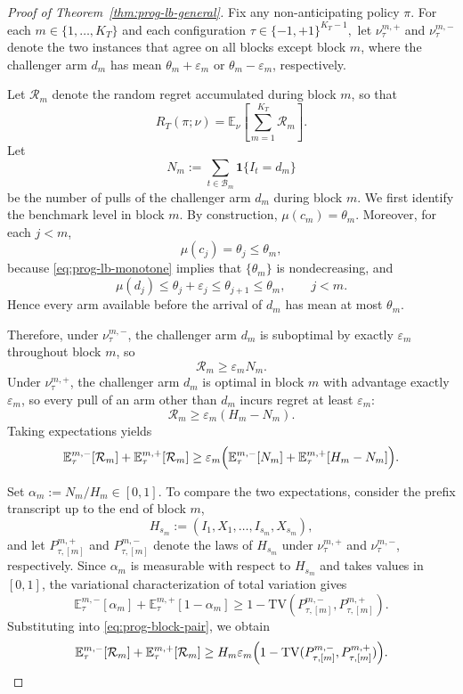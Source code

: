 \documentclass[11pt]{article}
\begin{document}
\begin{proof}[Proof of Theorem~\ref{thm:prog-lb-general}]
Fix any non-anticipating policy $\pi$.
For each $m\in\{1,\dots,K_T\}$ and each configuration
\(
\tau\in\{-1,+1\}^{K_T-1},
\)
let $\nu_{\tau}^{m,+}$ and $\nu_{\tau}^{m,-}$ denote the two instances that
agree on all blocks except block $m$, where the challenger arm $d_m$ has mean
$\theta_m+\varepsilon_m$ or $\theta_m-\varepsilon_m$, respectively.

Let $\mathcal R_m$ denote the random regret accumulated during block $m$, so
that
\[
R_T(\pi;\nu)
=
\mathbb E_\nu\!\left[\sum_{m=1}^{K_T} \mathcal R_m\right].
\]
Let
\[
N_m:=\sum_{t\in \mathcal{B}_m}\mathbf 1\{I_t=d_m\}
\]
be the number of pulls of the challenger arm $d_m$ during block $m$. We first identify the benchmark level in block $m$.
By construction, $\mu(c_m)=\theta_m$.
Moreover, for each $j<m$,
\[
\mu(c_j)=\theta_j\le \theta_m,
\]
because \eqref{eq:prog-lb-monotone} implies that $\{\theta_m\}$ is
nondecreasing, and
\[
\mu(d_j)\le \theta_j+\varepsilon_j\le \theta_{j+1}\le \theta_m,
\qquad j<m.
\]
Hence every arm available before the arrival of $d_m$ has mean at most
$\theta_m$.

Therefore, under $\nu_{\tau}^{m,-}$, the challenger arm $d_m$ is suboptimal by
exactly $\varepsilon_m$ throughout block $m$, so
\[
\mathcal R_m\ge \varepsilon_m N_m.
\]
Under $\nu_{\tau}^{m,+}$, the challenger arm $d_m$ is optimal in block $m$ with
advantage exactly $\varepsilon_m$, so every pull of an arm other than $d_m$
incurs regret at least $\varepsilon_m$:
\[
\mathcal R_m\ge \varepsilon_m(H_m-N_m).
\]
Taking expectations yields
\begin{equation}
\label{eq:prog-block-pair}
\mathbb E_{\tau}^{m,-}[\mathcal R_m]
+
\mathbb E_{\tau}^{m,+}[\mathcal R_m]
\ge
\varepsilon_m
\Bigl(
\mathbb E_{\tau}^{m,-}[N_m]
+
\mathbb E_{\tau}^{m,+}[H_m-N_m]
\Bigr).
\end{equation}

Set $\alpha_m:=N_m/H_m\in[0,1]$.
To compare the two expectations, consider the prefix transcript up to the end
of block $m$,
\[
H_{s_m}:=(I_1,X_1,\dots,I_{s_m},X_{s_m}),
\]
and let $P_{\tau,[m]}^{m,+}$ and $P_{\tau,[m]}^{m,-}$ denote the laws of
$H_{s_m}$ under $\nu_{\tau}^{m,+}$ and $\nu_{\tau}^{m,-}$, respectively.
Since $\alpha_m$ is measurable with respect to $H_{s_m}$ and takes values in
$[0,1]$, the variational characterization of total variation gives
\[
\mathbb E_{\tau}^{m,-}[\alpha_m]
+
\mathbb E_{\tau}^{m,+}[1-\alpha_m]
\ge
1-\mathrm{TV}(P_{\tau,[m]}^{m,-},P_{\tau,[m]}^{m,+}).
\]
Substituting into \eqref{eq:prog-block-pair}, we obtain
\begin{equation}
\label{eq:prog-block-tv}
\mathbb E_{\tau}^{m,-}[\mathcal R_m]
+
\mathbb E_{\tau}^{m,+}[\mathcal R_m]
\ge
H_m\varepsilon_m
\Bigl(
1-\mathrm{TV}(P_{\tau,[m]}^{m,-},P_{\tau,[m]}^{m,+})
\Bigr).
\end{equation}


\end{proof}
\end{document}

